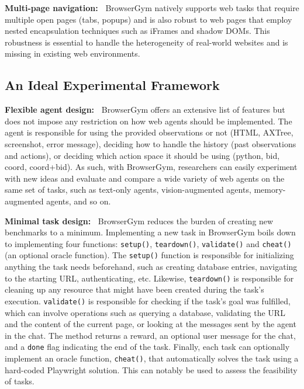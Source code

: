 \documentclass{article}
\theoremstyle{plain}
\theoremstyle{definition}
\theoremstyle{remark}
\newcommand{\paragraphtight}[1]{\textbf{#1~}}
\begin{document}
\paragraphtight{Multi-page navigation:} BrowserGym natively supports web tasks that require multiple open pages (tabs, popups) and is also robust to web pages that employ nested encapsulation techniques such as iFrames and shadow DOMs. This robustness is essential to handle the heterogeneity of real-world websites and is missing in existing web environments.


\subsection{An Ideal Experimental Framework}


\paragraphtight{Flexible agent design:} BrowserGym offers an extensive list of features but does not impose any restriction on how web agents should be implemented. The agent is responsible for using the provided observations or not (HTML, AXTree, screenshot, error message), deciding how to handle the history (past observations and actions), or deciding which action space it should be using (python, bid, coord, coord+bid). As such, with BrowserGym, researchers can easily experiment with new ideas and evaluate and compare a wide variety of web agents on the same set of tasks, such as text-only agents, vision-augmented agents, memory-augmented agents, and so on.

\paragraphtight{Minimal task design:} BrowserGym reduces the burden of creating new benchmarks to a minimum. Implementing a new task in BrowserGym boils down to implementing four functions: \texttt{\footnotesize setup()}, \texttt{\footnotesize teardown()}, \texttt{\footnotesize validate()} and \texttt{\footnotesize cheat()} (an optional oracle function). The \texttt{\footnotesize setup()} function is responsible for initializing anything the task needs beforehand, such as creating database entries, navigating to the starting URL, authenticating, etc. Likewise, \texttt{\footnotesize teardown()} is responsible for cleaning up any resource that might have been created during the task's execution. \texttt{\footnotesize validate()} is responsible for checking if the task's goal was fulfilled, which can involve operations such as querying a database, validating the URL and the content of the current page, or looking at the messages sent by the agent in the chat. The method returns a reward, an optional user message for the chat, and a \texttt{\footnotesize done} flag indicating the end of the task. Finally, each task can optionally implement an oracle function, \texttt{\footnotesize cheat()}, that automatically solves the task using a hard-coded Playwright solution. This can notably be used to assess the feasibility of tasks.
\end{document}
